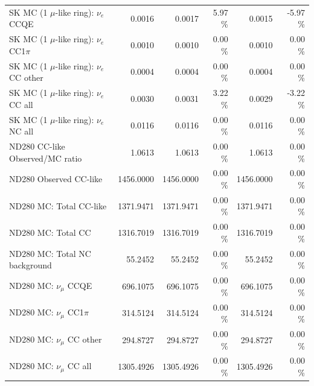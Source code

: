 \begin{table}
\begin{tabular}{| l | r | r  r | r  r |}
                             SK MC (1 $\mu$-like ring): $\nu_{e}$ CCQE &          0.0016 &          0.0017 &  5.97 \%  &          0.0015 & -5.97 \%  \\ 
                         SK MC (1 $\mu$-like ring): $\nu_{e}$ CC1$\pi$ &          0.0010 &          0.0010 &  0.00 \%  &          0.0010 &  0.00 \%  \\ 
                         SK MC (1 $\mu$-like ring): $\nu_{e}$ CC other &          0.0004 &          0.0004 &  0.00 \%  &          0.0004 &  0.00 \%  \\ 
                           SK MC (1 $\mu$-like ring): $\nu_{e}$ CC all &          0.0030 &          0.0031 &  3.22 \%  &          0.0029 & -3.22 \%  \\ 
                           SK MC (1 $\mu$-like ring): $\nu_{e}$ NC all &          0.0116 &          0.0116 &  0.00 \%  &          0.0116 &  0.00 \%  \\ 
\hline
                                       ND280 CC-like Observed/MC ratio &          1.0613 &          1.0613 &  0.00 \%  &          1.0613 &  0.00 \%  \\ 
                                                ND280 Observed CC-like &       1456.0000 &       1456.0000 &  0.00 \%  &       1456.0000 &  0.00 \%  \\ 
                                               ND280 MC: Total CC-like &       1371.9471 &       1371.9471 &  0.00 \%  &       1371.9471 &  0.00 \%  \\ 
                                                    ND280 MC: Total CC &       1316.7019 &       1316.7019 &  0.00 \%  &       1316.7019 &  0.00 \%  \\ 
                                         ND280 MC: Total NC background &         55.2452 &         55.2452 &  0.00 \%  &         55.2452 &  0.00 \%  \\ 
\hline
                                            ND280 MC: $\nu_{\mu}$ CCQE &        696.1075 &        696.1075 &  0.00 \%  &        696.1075 &  0.00 \%  \\ 
                                        ND280 MC: $\nu_{\mu}$ CC1$\pi$ &        314.5124 &        314.5124 &  0.00 \%  &        314.5124 &  0.00 \%  \\ 
                                        ND280 MC: $\nu_{\mu}$ CC other &        294.8727 &        294.8727 &  0.00 \%  &        294.8727 &  0.00 \%  \\ 
                                          ND280 MC: $\nu_{\mu}$ CC all &       1305.4926 &       1305.4926 &  0.00 \%  &       1305.4926 &  0.00 \%  \\ 

\end{tabular}
\end{table}
